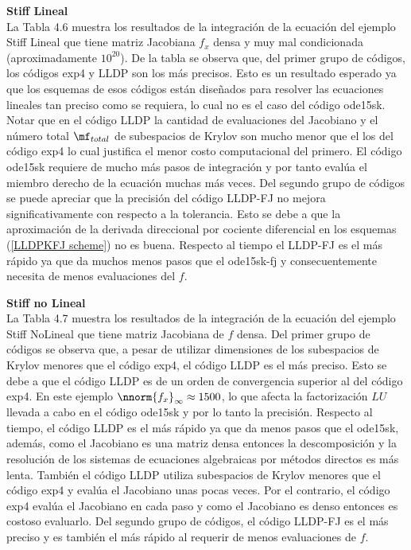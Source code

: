 \textbf{Stiff Lineal}\\
 La Tabla 4.6 muestra los resultados de la integración de la ecuación del ejemplo Stiff Lineal que tiene matriz Jacobiana $f_x$ densa y muy mal condicionada (aproximadamente $10^{20}$). De la tabla se observa que, del primer grupo de códigos, los códigos exp4 y LLDP son los m\'as precisos. Esto es un resultado esperado ya que los esquemas de esos códigos est\'an diseñados para resolver las ecuaciones lineales tan preciso como se requiera, lo cual no es el caso del código ode15sk. Notar que en el código LLDP la cantidad de evaluaciones del Jacobiano y el número total $\mf_{total}$ de subespacios de Krylov son mucho menor que el los del código exp4 lo cual justifica el menor costo computacional del primero. El código ode15sk requiere de mucho más pasos de integración y por tanto evalúa el miembro derecho de la ecuación muchas más veces. Del segundo grupo de códigos se puede apreciar que la precisión del código LLDP-FJ no mejora significativamente con respecto a la tolerancia. Esto se debe a que la aproximaci\'on de la derivada direccional por cociente diferencial en los esquemas (\ref{LLDPKFJ scheme}) no es buena. Respecto al tiempo el LLDP-FJ es el m\'as r\'apido ya que da muchos menos pasos que el ode15sk-fj y consecuentemente necesita de menos evaluaciones del $f$. 
 
\textbf{Stiff no Lineal}\\
La Tabla 4.7 muestra los resultados de la integración de la ecuación del ejemplo Stiff NoLineal que tiene matriz Jacobiana de $f$ densa. Del primer grupo de códigos se observa que, a pesar de utilizar dimensiones de los subespacios de Krylov menores que el código exp4, el código LLDP es el m\'as preciso. Esto se debe a que el código LLDP es de un orden de convergencia superior al del código exp4. En este ejemplo $\nnorm{f_x}_\infty\approx 1500$, lo que afecta la factorización $LU$~\cite{Golub96} llevada a cabo en el código ode15sk y por lo tanto la precisión. Respecto al tiempo, el código LLDP es el m\'as r\'apido ya que da menos pasos que el ode15sk, además, como el Jacobiano es una matriz densa entonces la descomposición y la resolución de los sistemas de ecuaciones algebraicas por métodos directos es más lenta. También el código LLDP utiliza subespacios de Krylov menores que el código exp4 y evalúa el Jacobiano unas pocas veces. Por el contrario, el código exp4 evalúa el Jacobiano en cada paso y como el Jacobiano es denso entonces es costoso evaluarlo. Del segundo grupo de códigos, el código LLDP-FJ es el m\'as preciso y es también el más rápido al requerir de menos evaluaciones de $f$.

